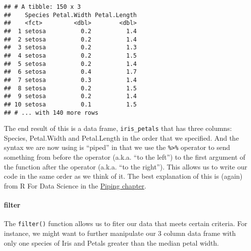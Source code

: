 \documentclass[]{article}
\newenvironment{Shaded}{\begin{snugshade}}{\end{snugshade}}
\newcommand{\DataTypeTok}[1]{\textcolor[rgb]{0.13,0.29,0.53}{#1}}
\newcommand{\KeywordTok}[1]{\textcolor[rgb]{0.13,0.29,0.53}{\textbf{#1}}}
\newcommand{\NormalTok}[1]{#1}
\newcommand{\OperatorTok}[1]{\textcolor[rgb]{0.81,0.36,0.00}{\textbf{#1}}}
\newcommand{\StringTok}[1]{\textcolor[rgb]{0.31,0.60,0.02}{#1}}
\let\oldparagraph\paragraph
\renewcommand{\paragraph}[1]{\oldparagraph{#1}\mbox{}}
\begin{document}
\begin{verbatim}
## # A tibble: 150 x 3
##    Species Petal.Width Petal.Length
##    <fct>         <dbl>        <dbl>
##  1 setosa          0.2          1.4
##  2 setosa          0.2          1.4
##  3 setosa          0.2          1.3
##  4 setosa          0.2          1.5
##  5 setosa          0.2          1.4
##  6 setosa          0.4          1.7
##  7 setosa          0.3          1.4
##  8 setosa          0.2          1.5
##  9 setosa          0.2          1.4
## 10 setosa          0.1          1.5
## # ... with 140 more rows
\end{verbatim}

The end result of this is a data frame, \texttt{iris\_petals} that has
three columns: Species, Petal.Width and Petal.Length in the order that
we specified. And the syntax we are now using is ``piped'' in that we
use the \texttt{\%\textgreater{}\%} operator to send something from
before the operator (a.k.a. ``to the left'') to the first argument of
the function after the operator (a.k.a. ``to the right''). This allows
us to write our code in the same order as we think of it. The best
explanation of this is (again) from R For Data Science in the
\href{http://r4ds.had.co.nz/pipes.html}{Piping chapter}.

\hypertarget{filter}{%
\paragraph{filter}\label{filter}}

The \texttt{filter()} function allows us to fiter our data that meets
certain criteria. For instance, we might want to further manipulate our
3 column data frame with only one species of Iris and Petals greater
than the median petal width.

\begin{Shaded}
\end{Shaded}
\end{document}
